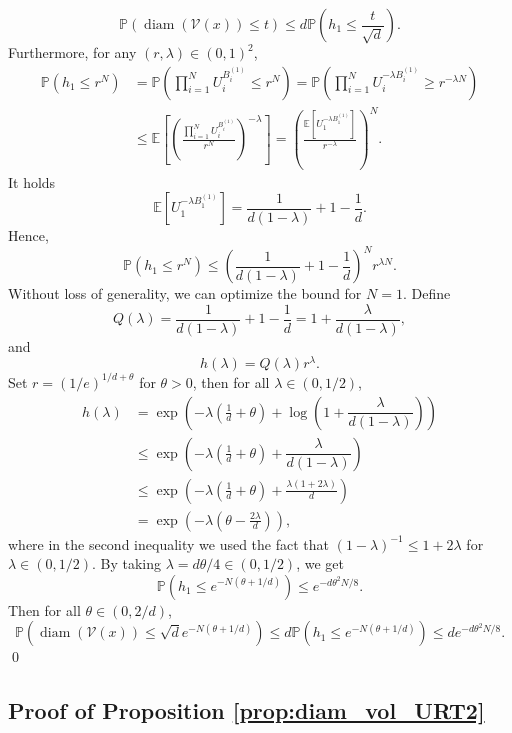 \documentclass[paper=a4, fontsize=11pt]{scrartcl}
\newcommand{\diam}{\operatorname{diam}}
\newcommand{\pr}{\mathbb{P}}
\begin{document}
\[
 \pr(\diam (\mathcal{V}(x))\leq t) \leq d\pr \left(h_1 \leq \frac{t}{\sqrt{d}}\right).
\]
Furthermore, for any $(r, \lambda)\in (0,1)^2$,
\begin{align*}
    \pr(h_1 \leq r^N) & = \pr\left(\prod_{i=1}^N U_i^{B_i^{(1)}} \leq r^N\right) = \pr\left(\prod_{i=1}^N U_i^{-\lambda B_i^{(1)}} \geq r^{-\lambda N} \right) \\
    & \leq \mathbb E\left[\left(\frac{\prod_{i=1}^N U_i^{B_i^{(1)}}}{r^N}\right)^{-\lambda} \right]=\left(\frac{\mathbb E\left[{U_1^{-\lambda B_1^{(1)}}}\right]}{r^{-\lambda}}\right)^N. 
\end{align*}
It holds
\[
 \mathbb E\left[{U_1^{-\lambda B_1^{(1)}}}\right]= \frac{1}{d(1-\lambda)}+1-\frac{1}{d}.
\]
Hence,
\[
 \pr(h_1 \leq r^N) \leq \left(\frac{1}{d(1-\lambda)}+1-\frac{1}{d}\right)^N r^{\lambda N}.
\]
Without loss of generality, we can optimize the bound for $N=1$. Define 
$$Q(\lambda)= \frac{1}{d(1-\lambda)}+1-\frac{1}{d} = 1 + \dfrac{\lambda}{d(1-\lambda)},$$
and
$$ h(\lambda)= Q(\lambda) r^{\lambda}.$$
Set $r=(1/e)^{1/d+\theta}$ for $\theta>0$, then for all $\lambda \in (0, 1/2)$,
\begin{align*}
    h(\lambda)
    & =   \exp\left(-\lambda\left(\frac{1}{d}+\theta\right)+\log\left(1 + \dfrac{\lambda}{d(1-\lambda)}\right)\right)\\
    & \leq  \exp\left(-\lambda\left(\frac{1}{d}+\theta\right)+ \dfrac{\lambda}{d(1-\lambda)}\right) \\
    & \leq  \exp\left(-\lambda\left(\frac{1}{d}+\theta\right)+ \frac{\lambda(1+2\lambda)}{d}\right) \\
    & =   \exp\left(-\lambda\left(\theta-\frac{2\lambda}{d}\right)\right),
\end{align*}
where in the second inequality we used the fact that $(1-\lambda)^{-1} \leq 1+2\lambda$ for $\lambda \in (0,1/2)$. By taking $\lambda= d\theta/4 \in (0, 1/2)$, we get
\[
 \pr(h_1 \leq e^{-N(\theta+1/d)}) \leq e^{-d\theta^{2}N/8}.
\]
Then for all $\theta \in (0, 2/d)$,
\[
 \pr(\diam(\mathcal{V}(x))\leq \sqrt{d}e^{-N(\theta+1/d)}) \leq d\pr \left(h_1 \leq e^{-N(\theta+1/d)}\right) \leq d e^{-d\theta^{2}N/8}.
\] \qed

\subsection*{Proof of Proposition \ref{prop:diam_vol_URT2}}
\end{document}

